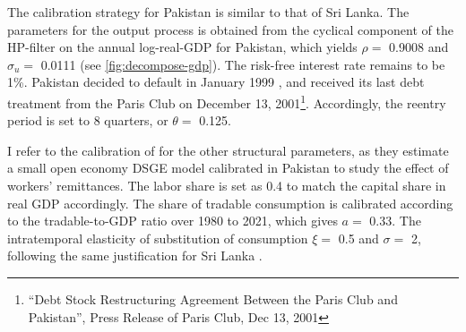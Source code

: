 The calibration strategy for Pakistan is similar to that of Sri Lanka.
The parameters for the output process is obtained from the cyclical component of the HP-filter on the annual log-real-GDP for Pakistan, which yields $\rho = $ 0.9008 and $\sigma_u=$ 0.0111 (see \autoref{fig:decompose-gdp}).
The risk-free interest rate remains to be 1\%.
Pakistan decided to default in January 1999 \citep{pakistan-default-start}, and received its last debt treatment from the Paris Club on December 13, 2001\footnote{``Debt Stock Restructuring Agreement Between
the Paris Club and Pakistan'', Press Release of Paris Club, Dec 13, 2001}.
Accordingly, the reentry period is set to 8 quarters, or $\theta=$ 0.125.

I refer to the calibration of \citet{Pakistan-DSGE-calibration} for the other structural parameters, as they estimate a small open economy DSGE model calibrated in Pakistan to study the effect of workers' remittances.
The labor share is set as 0.4 to match the capital share in real GDP accordingly. The share of tradable consumption is calibrated according to the tradable-to-GDP ratio over 1980 to 2021, which gives $a=$ 0.33. The intratemporal elasticity of substitution of consumption $\xi=$ 0.5 and $\sigma=$ 2, following the same justification for Sri Lanka \citep{Pakistan-DSGE-calibration,Uribe-Schmitt-Grohe-textbook}.

